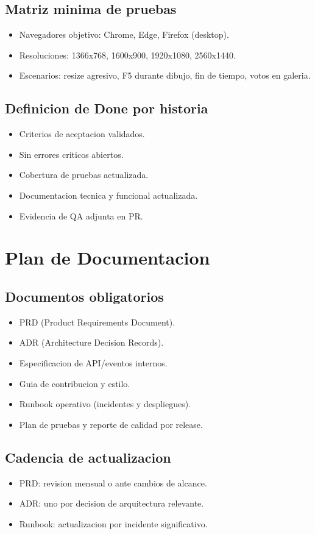 \documentclass[12pt,a4paper]{article}
\begin{document}
\subsection{Matriz minima de pruebas}
\begin{itemize}
  \item Navegadores objetivo: Chrome, Edge, Firefox (desktop).
  \item Resoluciones: 1366x768, 1600x900, 1920x1080, 2560x1440.
  \item Escenarios: resize agresivo, F5 durante dibujo, fin de tiempo, votos en galeria.
\end{itemize}

\subsection{Definicion de Done por historia}
\begin{itemize}
  \item Criterios de aceptacion validados.
  \item Sin errores criticos abiertos.
  \item Cobertura de pruebas actualizada.
  \item Documentacion tecnica y funcional actualizada.
  \item Evidencia de QA adjunta en PR.
\end{itemize}

\section{Plan de Documentacion}
\subsection{Documentos obligatorios}
\begin{itemize}
  \item PRD (Product Requirements Document).
  \item ADR (Architecture Decision Records).
  \item Especificacion de API/eventos internos.
  \item Guia de contribucion y estilo.
  \item Runbook operativo (incidentes y despliegues).
  \item Plan de pruebas y reporte de calidad por release.
\end{itemize}

\subsection{Cadencia de actualizacion}
\begin{itemize}
  \item PRD: revision mensual o ante cambios de alcance.
  \item ADR: uno por decision de arquitectura relevante.
  \item Runbook: actualizacion por incidente significativo.
\end{itemize}
\end{document}
